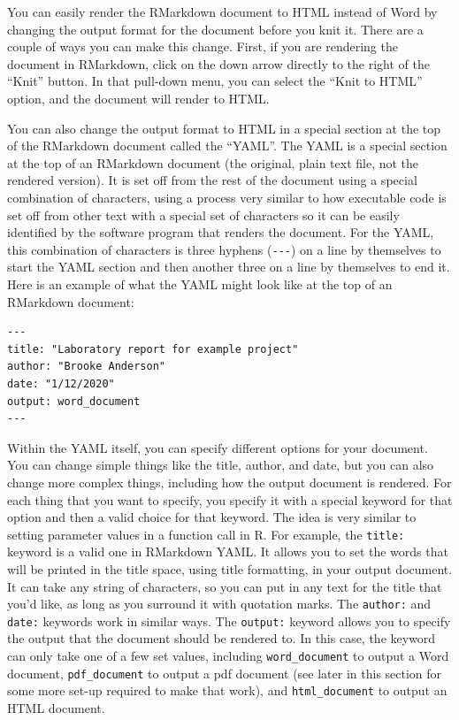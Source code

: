 \documentclass[]{tufte-book}
\begin{document}
You can easily render the RMarkdown document to HTML instead of Word by
changing the output format for the document before you knit it. There are
a couple of ways you can make this change. First, if you are rendering the
document in RMarkdown, click on the down arrow directly to the right of
the ``Knit'' button. In that pull-down menu, you can select the ``Knit to
HTML'' option, and the document will render to HTML.

You can also change the output format to HTML in a special section at the top of
the RMarkdown document called the ``YAML''. The YAML is a special section at the
top of an RMarkdown document (the original, plain text file, not the rendered
version). It is set off from the rest of the document using a special
combination of characters, using a process very similar to how executable code
is set off from other text with a special set of characters so it can be easily
identified by the software program that renders the document. For the YAML, this
combination of characters is three hyphens (\texttt{-\/-\/-}) on a line by themselves to
start the YAML section and then another three on a line by themselves to end it.
Here is an example of what the YAML might look like at the top of an RMarkdown
document:

\begin{verbatim}
---
title: "Laboratory report for example project"
author: "Brooke Anderson"
date: "1/12/2020"
output: word_document
---
\end{verbatim}

Within the YAML itself, you can specify different options for your document.
You can change simple things like the title, author, and date, but you can
also change more complex things, including how the output document is rendered.
For each thing that you want to specify, you specify it with a special
keyword for that option and then a valid choice for that keyword. The idea
is very similar to setting parameter values in a function call in R. For
example, the \texttt{title:} keyword is a valid one in RMarkdown YAML. It allows you
to set the words that will be printed in the title space, using title formatting,
in your output document. It can take any string of characters, so you can put in
any text for the title that you'd like, as long as you surround it with quotation
marks. The \texttt{author:} and \texttt{date:} keywords work in similar ways. The \texttt{output:}
keyword allows you to specify the output that the document should be rendered to.
In this case, the keyword can only take one of a few set values, including
\texttt{word\_document} to output a Word document, \texttt{pdf\_document} to output a pdf
document (see later in this section for some more set-up required to make that
work), and \texttt{html\_document} to output an HTML document.
\end{document}
